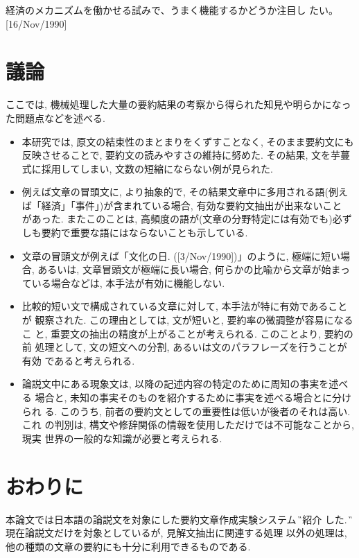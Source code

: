 \begin{sample}
\item 経済のメカニズムを働かせる試みで、うまく機能するかどうか注目し
たい。[16/Nov/1990]\label{主語なし}
\end{sample}


\section{議論}\label{議論}

ここでは, 機械処理した大量の要約結果の考察から得られた知見や明らかになっ
た問題点などを述べる. 

\begin{itemize}
\item 
本研究では, 原文の結束性のまとまりをくずすことなく, そのまま要約文にも
反映させることで, 要約文の読みやすさの維持に努めた. その結果, 文を芋蔓
式に採用してしまい, 文数の短縮にならない例が見られた. 
\item
例えば文章の冒頭文に, より抽象的で, その結果文章中に多用される語(例え
ば「経済」「事件」)が含まれている場合, 有効な要約文抽出が出来ないこと
があった. またこのことは, 高頻度の語が(文章の分野特定には有効でも)必ず
しも要約で重要な語にはならないことも示している. 
\item
文章の冒頭文が例えば「文化の日. ([3/Nov/1990])」のように, 極端に短い場
合, あるいは, 文章冒頭文が極端に長い場合, 何らかの比喩から文章が始まっ
ている場合などは, 本手法が有効に機能しない. 
\item
比較的短い文で構成されている文章に対して, 本手法が特に有効であることが
観察された. この理由としては, 文が短いと, 要約率の微調整が容易になるこ
と, 重要文の抽出の精度が上がることが考えられる. このことより, 要約の前
処理として, 文の短文への分割, あるいは文のパラフレーズを行うことが有効
であると考えられる. 
\item
論説文中にある現象文は, 以降の記述内容の特定のために周知の事実を述べる
場合と, 未知の事実そのものを紹介するために事実を述べる場合とに分けられ
る. このうち, 前者の要約文としての重要性は低いが後者のそれは高い. これ
の判別は, 構文や修辞関係の情報を使用しただけでは不可能なことから, 現実
世界の一般的な知識が必要と考えられる. 
\end{itemize}



\section{おわりに}\label{まとめ}

本論文では日本語の論説文を対象にした要約文章作成実験システム \G を紹介
した. \G は現在論説文だけを対象としているが, 見解文抽出に関連する処理
以外の処理は, 他の種類の文章の要約にも十分に利用できるものである. 

